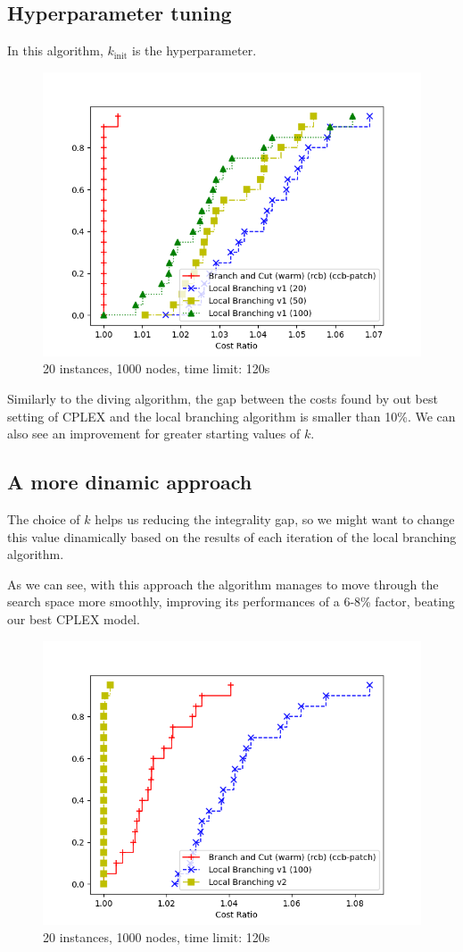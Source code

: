 \subsection{Hyperparameter tuning}

In this algorithm, $k_{\text{init}}$ is the hyperparameter.

\begin{figure}[h]
    \centering
    \includegraphics*[width=.6\textwidth]{../plots/perfprof_lbv1_costs.png}
    \caption*{20 instances, 1000 nodes, time limit: 120s}
\end{figure}

Similarly to the diving algorithm, the gap between the costs found by out best setting of CPLEX and the local branching algorithm is smaller than 10\%. We can also see an improvement for greater starting values of $k$.

\subsection{A more dinamic approach}
The choice of $k$ helps us reducing the integrality gap, so we might want to change this value dinamically based on the results of each iteration of the local branching algorithm.

As we can see, with this approach the algorithm manages to move through the search space more smoothly, improving its performances of a 6-8\% factor, beating our best CPLEX model.

\begin{figure}[h]
    \centering
    \includegraphics*[width=.6\textwidth]{../plots/perfprof_lb_costs.png}
    \caption*{20 instances, 1000 nodes, time limit: 120s}
\end{figure}

